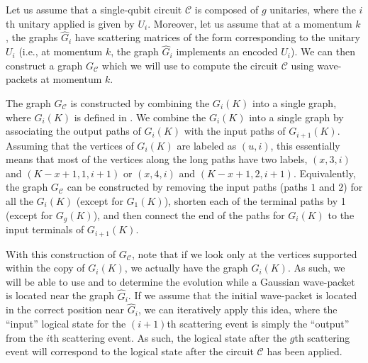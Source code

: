\documentclass[../thesis-main/thesis-main]{subfiles}
\begin{document}

Let us assume that a single-qubit circuit $\mathcal{C}$ is composed of $g$ unitaries, where the $i$th unitary applied is given by $U_i$.  Moreover, let us assume that at a momentum $k$, the graphs $\widehat{G}_i$ have scattering matrices of the form  corresponding to the unitary $U_i$ (i.e., at momentum $k$, the graph $\widehat{G}_i$ implements an encoded $U_i$).  We can then construct a graph $G_{\mathcal{C}}$ which we will use to compute the circuit $\mathcal{C}$ using wave-packets at momentum $k$. 


The graph $G_{\mathcal{C}}$ is constructed by combining the $G_i(K)$ into a single graph, where $G_i(K)$ is defined in .  We combine the $G_i(K)$ into a single graph by associating the output paths of $G_i(K)$ with the input paths of $G_{i+1}(K)$.  Assuming that the vertices of $G_i(K)$ are labeled as $(u,i)$, this essentially means that most of the vertices along the long paths have two labels, $(x,3, i)$ and $(K-x+1,1,i+1)$ or $(x,4,i)$ and $(K-x+1,2,i+1)$.  Equivalently, the graph $G_{\mathcal{C}}$ can be constructed by removing the input paths (paths $1$ and $2$) for all the $G_i(K)$ (except for $G_1(K)$), shorten each of the terminal paths by 1 (except for $G_g(K)$), and then connect the end of the paths for $G_i(K)$ to the input terminals of $G_{i+1}(K)$.


With this construction of $G_{\mathcal{C}}$, note that if we look only at the vertices supported within the copy of $G_i(K)$, we actually have the graph $G_i(K)$.  As such, we will be able to use  and  to determine the evolution while a Gaussian wave-packet is located near the graph $\widehat{G}_i$.  If we assume that the initial wave-packet is located in the correct position near $\widehat{G}_i$, we can iteratively apply this idea, where the ``input'' logical state for the $(i+1)$th scattering event is simply the ``output'' from the $i$th scattering event.  As such, the logical state after the $g$th scattering event will correspond to the logical state after the circuit $\mathcal{C}$ has been applied.  

\end{document}
